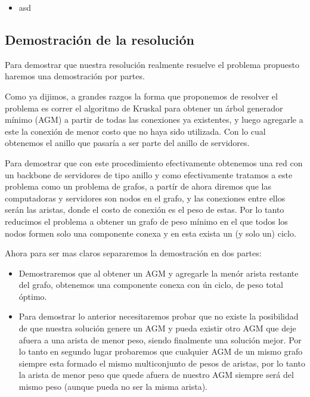 \begin{itemize}
\item asd
\end{itemize}


\newpage


\subsection{Demostraci\'on de la resoluci\'on}

Para demostrar que nuestra resoluci\'on realmente resuelve el problema propuesto haremos una demostraci\'on por partes.

Como ya dijimos, a grandes razgos la forma que proponemos de resolver el problema es correr el algoritmo de Kruskal para obtener un \'arbol generador mínimo (AGM) a partir de todas las conexiones ya existentes, y luego agregarle a este la conexión de menor costo que no haya sido utilizada. Con lo cual obtenemos el anillo que pasaría a ser parte del anillo de servidores.

Para demostrar que con este procedimiento efectivamente obtenemos una red con un backbone de servidores de tipo anillo y como efectivamente tratamos a este problema como un problema de grafos, a part\'ir de ahora diremos que las computadoras y servidores son nodos en el grafo, y las conexiones entre ellos serán las aristas, donde el costo de conexión es el peso de estas. Por lo tanto reducimos el problema a obtener un grafo de peso mínimo en el que todos los nodos formen solo una componente conexa y en esta exista un (y solo un) ciclo.

Ahora para ser mas claros separaremos la demostraci\'on en dos partes:

\begin{itemize}
\item Demostraremos que al obtener un AGM y agregarle la men\'or arista restante del grafo, obtenemos una componente conexa con \'un ciclo, de peso total óptimo.
\item Para demostrar lo anterior necesitaremos probar que no existe la posibilidad de que nuestra soluci\'on genere un AGM y pueda existir otro AGM que deje afuera a una arista de menor peso, siendo finalmente una soluci\'on mejor. Por lo tanto en segundo lugar probaremos que cualquier AGM de un mismo grafo siempre esta formado el mismo multiconjunto de pesos de aristas, por lo tanto la arista de menor peso que quede afuera de nuestro AGM siempre será del mismo peso (aunque pueda no ser la misma arista).
\end{itemize}

